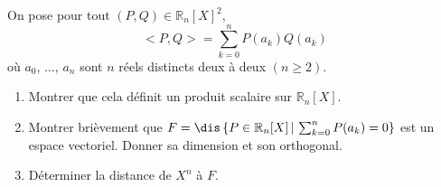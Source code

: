 \documentclass[a4paper,10pt]{report}
\begin{document}
\begin{Exa} On pose pour tout $(P,Q) \in \mathbb{R}_n[X]^2$,
$$ <P,Q> = \sum_{k=0}^n P(a_k) Q(a_k)$$
où $a_0$, $\ldots$, $a_n$ sont $n$ réels distincts deux à deux $(n \geq 2)$.
\begin{enumerate}
\item Montrer que cela définit un produit scalaire sur $\mathbb{R}_n[X]$.
\item Montrer brièvement que $F= \dis \left\lbrace P \in \mathbb{R}_n[X] \, \vert \, \sum_{k=0}^n P(a_k)=0 \right\rbrace$ est un espace vectoriel. Donner sa dimension et son orthogonal.
\item Déterminer la distance de $X^n$ à $F$.
\end{enumerate}
\end{Exa}

%
%
\end{document}
